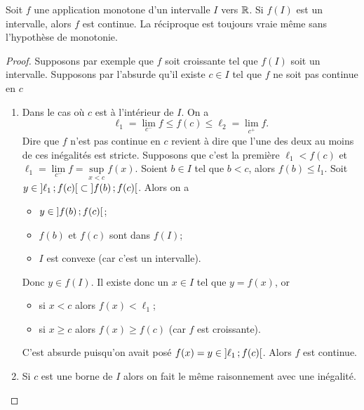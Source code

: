 \begin{theo}\label{theo:monotone-intervalle-donc-continue}
  Soit \(f\) une application monotone d'un intervalle \(I\) vers \(\mathbb{R}\). Si 
  \(f(I)\) est un intervalle, alors \(f\) est continue. La réciproque est 
  toujours vraie même sans l'hypothèse de monotonie.
\end{theo}
\begin{proof}
  Supposons par exemple que \(f\) soit croissante tel que \(f(I)\) soit un 
  intervalle. Supposons par l'absurde qu'il existe \(c \in I\) tel que \(f\) ne 
  soit pas continue en \(c\)
  \begin{enumerate}
    \item Dans le cas où \(c\) est à l'intérieur de \(I\). On a
      \begin{equation}
        \ell_1 = \lim\limits_{c^{-}}f \leqslant f(c) \leqslant \ell_2 = 
        \lim\limits_{c^{+}}f.
      \end{equation}
      Dire que \(f\) n'est pas continue en \(c\) revient à dire que l'une des 
      deux au moins de ces inégalités est stricte. Supposons que c'est la 
      première \(\ell_1 < f(c)\) et \(\ell_1 = \lim\limits_{c^{-}}f = 
      \sup\limits_{x < c} f(x)\). Soient \(b \in I\) tel que \(b < c\), alors 
      \(f(b) \leqslant l_1\). Soit \(y \in \left] \ell_1 \, ;  f(c) \right[ \subset 
      \left] f(b) \, ;  f(c) \right[\). Alors on a
      \begin{itemize}
        \item \(y \in \left] f(b) \, ;  f(c) \right[\);
        \item \(f(b)\) et \(f(c)\) sont dans \(f(I)\);
        \item \(I\) est convexe (car c'est un intervalle).
      \end{itemize}
      Donc \(y \in f(I)\). Il existe donc un \(x \in I\) tel que \(y=f(x)\), or
      \begin{itemize}
        \item si \(x < c\) alors \(f(x) < \ell_1\);
        \item si \(x \geqslant c\) alors \(f(x) \geqslant f(c)\) (car \(f\) est 
          croissante).
      \end{itemize}
      C'est absurde puisqu'on avait posé \(f(x)=y \in 
      \left] \ell_1 \, ;  f(c) \right[\). Alors \(f\) est continue.
    \item Si \(c\) est une borne de \(I\) alors on fait le même raisonnement 
      avec une inégalité.
  \end{enumerate}
\end{proof}

